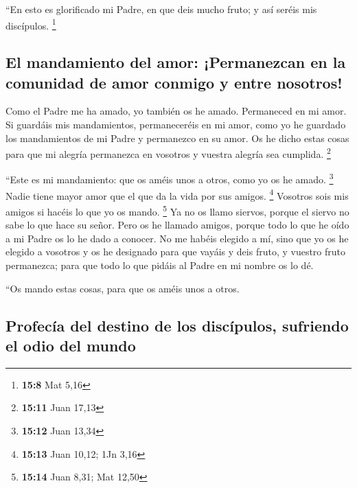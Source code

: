 \begin{paracol}{2}
 ``En esto es glorificado mi Padre, en que deis mucho
fruto; y así seréis mis discípulos. \footnote{\textbf{15:8} Mat 5,16}

\hypertarget{el-mandamiento-del-amor-permanezcan-en-la-comunidad-de-amor-conmigo-y-entre-nosotros}{%
\subsection{El mandamiento del amor: ¡Permanezcan en la comunidad de
amor conmigo y entre
nosotros!}\label{el-mandamiento-del-amor-permanezcan-en-la-comunidad-de-amor-conmigo-y-entre-nosotros}}

 Como el Padre me ha amado, yo también os he amado.
Permaneced en mi amor.  Si guardáis mis mandamientos,
permaneceréis en mi amor, como yo he guardado los mandamientos de mi
Padre y permanezco en su amor.  Os he dicho estas cosas
para que mi alegría permanezca en vosotros y vuestra alegría sea
cumplida. \footnote{\textbf{15:11} Juan 17,13}

 ``Este es mi mandamiento: que os améis unos a otros,
como yo os he amado. \footnote{\textbf{15:12} Juan 13,34}
 Nadie tiene mayor amor que el que da la vida por sus
amigos. \footnote{\textbf{15:13} Juan 10,12; 1Jn 3,16} 
Vosotros sois mis amigos si hacéis lo que yo os mando. \footnote{\textbf{15:14}
  Juan 8,31; Mat 12,50}  Ya no os llamo siervos, porque
el siervo no sabe lo que hace su señor. Pero os he llamado amigos,
porque todo lo que he oído a mi Padre os lo he dado a conocer.
 No me habéis elegido a mí, sino que yo os he elegido a
vosotros y os he designado para que vayáis y deis fruto, y vuestro fruto
permanezca; para que todo lo que pidáis al Padre en mi nombre os lo dé.

 ``Os mando estas cosas, para que os améis unos a otros.

\hypertarget{profecuxeda-del-destino-de-los-discuxedpulos-sufriendo-el-odio-del-mundo}{%
\subsection{Profecía del destino de los discípulos, sufriendo el odio
del
mundo}\label{profecuxeda-del-destino-de-los-discuxedpulos-sufriendo-el-odio-del-mundo}}


\end{paracol}
